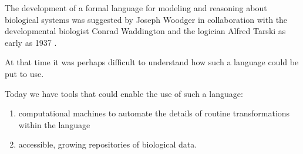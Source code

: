 \begin{frame}
\begin{block}{}
The development of a formal language for modeling and reasoning about biological systems was suggested by Joseph Woodger in collaboration with the developmental biologist Conrad Waddington and the logician Alfred Tarski as early as 1937 \cite{Woodger1937,Woodger1951,Woodger1952,Woodger1952a}. 
\end{block}
\begin{block}{}
At that time it was perhaps difficult to understand how such a language could be put to use. 
\end{block}
\begin{block}{}
Today we have tools that could enable the use of such a language:

\begin{enumerate}
\item computational machines to automate the details of routine transformations within the language 
\item accessible, growing repositories of biological data.
\end{enumerate} 
\end{block}
\end{frame}